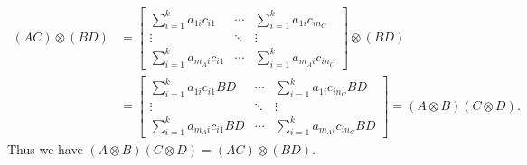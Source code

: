 \begin{align*}
  (AC)\otimes (BD) &= \begin{bmatrix}
 \sum\limits^{k}_{i = 1}a_{1i}c_{i1} & \cdots & \sum\limits^{k}_{i = 1}a_{1i}c_{in_{C}}\\
 \vdots & \ddots & \vdots\\
 \sum\limits^{k}_{i = 1}a_{m_{A}i}c_{i1} & \cdots & \sum\limits^{k}_{i = 1}a_{m_{A}i}c_{in_{C}}
 \end{bmatrix} \otimes (BD)\\
 &=  \begin{bmatrix}
\sum\limits^{k}_{i = 1}a_{1i}c_{i1}BD & \cdots & \sum\limits^{k}_{i = 1}a_{1i}c_{in_{C}}BD\\
\vdots & \ddots & \vdots\\
\sum\limits^{k}_{i = 1}a_{m_{A}i}c_{i1}BD & \cdots & \sum\limits^{k}_{i = 1}a_{m_{A}i}c_{in_{C}}BD
\end{bmatrix} = (A\otimes B)(C\otimes D) .
\end{align*}
Thus we have $(A\otimes B)(C\otimes D) = (AC)\otimes (BD)$.
